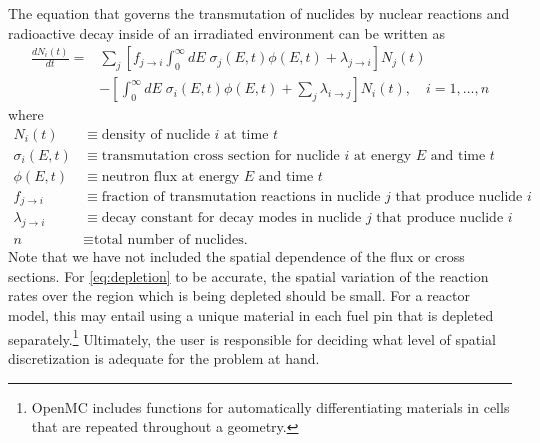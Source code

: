 \documentclass[3p,authoryear]{elsarticle}
\begin{document}
The equation that governs the transmutation of nuclides by nuclear reactions and
radioactive decay inside of an irradiated environment can be written as
\begin{equation}
  \label{eq:depletion}
  \begin{split}
  \frac{dN_i(t)}{dt} = &\sum\limits_j \left [ f_{j \rightarrow i}
  \int_0^\infty dE \; \sigma_j (E, t) \phi(E,t) + \lambda_{j\rightarrow i}
  \right ] N_j(t) \\ &- \left [\int_0^\infty dE \; \sigma_i (E,t) \phi(E,t) +
  \sum\limits_j \lambda_{i\rightarrow j} \right ] N_i(t), \quad i=1,\dots,n
  \end{split}
\end{equation}
where
\begin{equation*}
  \begin{split}
  N_i(t) &\equiv \text{density of nuclide $i$ at time $t$} \\
  \sigma_i(E,t) &\equiv \text{transmutation cross section for nuclide $i$ at energy $E$ and time $t$} \\
  \phi(E,t) &\equiv \text{neutron flux at energy $E$ and time $t$} \\
  f_{j \rightarrow i} &\equiv \text{fraction of transmutation reactions in nuclide $j$ that produce nuclide $i$} \\
  \lambda_{j \rightarrow i} &\equiv \text{decay constant for decay modes in nuclide $j$ that produce nuclide $i$} \\
  n &\equiv \text{total number of nuclides.}
  \end{split}
\end{equation*}
Note that we have not included the spatial dependence of the flux or cross
sections. For \cref{eq:depletion} to be accurate, the spatial variation of the
reaction rates over the region which is being depleted should be small. For a
reactor model, this may entail using a unique material in each fuel pin that is
depleted separately.\footnote{OpenMC includes functions for automatically
differentiating materials in cells that are repeated throughout a geometry.}
Ultimately, the user is responsible for deciding what level of spatial
discretization is adequate for the problem at hand.
\end{document}
